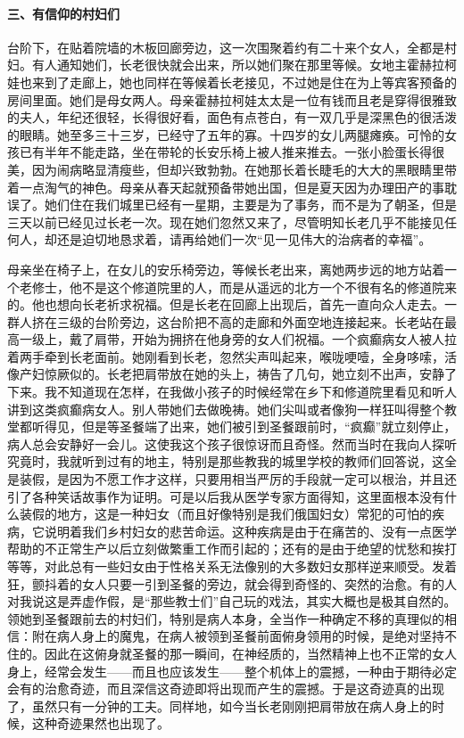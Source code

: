 \paragraph*{三、有信仰的村妇们}
\par 台阶下，在贴着院墙的木板回廊旁边，这一次围聚着约有二十来个女人，全都是村妇。有人通知她们，长老很快就会出来，所以她们聚在那里等候。女地主霍赫拉柯娃也来到了走廊上，她也同样在等候着长老接见，不过她是住在为上等宾客预备的房间里面。她们是母女两人。母亲霍赫拉柯娃太太是一位有钱而且老是穿得很雅致的夫人，年纪还很轻，长得很好看，面色有点苍白，有一双几乎是深黑色的很活泼的眼睛。她至多三十三岁，已经守了五年的寡。十四岁的女儿两腿瘫痪。可怜的女孩已有半年不能走路，坐在带轮的长安乐椅上被人推来推去。一张小脸蛋长得很美，因为闹病略显清瘦些，但却兴致勃勃。在她那长着长睫毛的大大的黑眼睛里带着一点淘气的神色。母亲从春天起就预备带她出国，但是夏天因为办理田产的事耽误了。她们住在我们城里已经有一星期，主要是为了事务，而不是为了朝圣，但是三天以前已经见过长老一次。现在她们忽然又来了，尽管明知长老几乎不能接见任何人，却还是迫切地恳求着，请再给她们一次“见一见伟大的治病者的幸福”。
\par 母亲坐在椅子上，在女儿的安乐椅旁边，等候长老出来，离她两步远的地方站着一个老修士，他不是这个修道院里的人，而是从遥远的北方一个不很有名的修道院来的。他也想向长老祈求祝福。但是长老在回廊上出现后，首先一直向众人走去。一群人挤在三级的台阶旁边，这台阶把不高的走廊和外面空地连接起来。长老站在最高一级上，戴了肩带，开始为拥挤在他身旁的女人们祝福。一个疯癫病女人被人拉着两手牵到长老面前。她刚看到长老，忽然尖声叫起来，喉咙哽噎，全身哆嗦，活像产妇惊厥似的。长老把肩带放在她的头上，祷告了几句，她立刻不出声，安静了下来。我不知道现在怎样，在我做小孩子的时候经常在乡下和修道院里看见和听人讲到这类疯癫病女人。别人带她们去做晚祷。她们尖叫或者像狗一样狂叫得整个教堂都听得见，但是等圣餐端了出来，她们被引到圣餐跟前时，“疯癫”就立刻停止，病人总会安静好一会儿。这使我这个孩子很惊讶而且奇怪。然而当时在我向人探听究竟时，我就听到过有的地主，特别是那些教我的城里学校的教师们回答说，这全是装假，是因为不愿工作才这样，只要用相当严厉的手段就一定可以根治，并且还引了各种笑话故事作为证明。可是以后我从医学专家方面得知，这里面根本没有什么装假的地方，这是一种妇女（而且好像特别是我们俄国妇女）常犯的可怕的疾病，它说明着我们乡村妇女的悲苦命运。这种疾病是由于在痛苦的、没有一点医学帮助的不正常生产以后立刻做繁重工作而引起的；还有的是由于绝望的忧愁和挨打等等，对此总有一些妇女由于性格关系无法像别的大多数妇女那样逆来顺受。发着狂，颤抖着的女人只要一引到圣餐的旁边，就会得到奇怪的、突然的治愈。有的人对我说这是弄虚作假，是“那些教士们”自己玩的戏法，其实大概也是极其自然的。领她到圣餐跟前去的村妇们，特别是病人本身，全当作一种确定不移的真理似的相信：附在病人身上的魔鬼，在病人被领到圣餐前面俯身领用的时候，是绝对坚持不住的。因此在这俯身就圣餐的那一瞬间，在神经质的，当然精神上也不正常的女人身上，经常会发生——而且也应该发生——整个机体上的震撼，一种由于期待必定会有的治愈奇迹，而且深信这奇迹即将出现而产生的震撼。于是这奇迹真的出现了，虽然只有一分钟的工夫。同样地，如今当长老刚刚把肩带放在病人身上的时候，这种奇迹果然也出现了。
